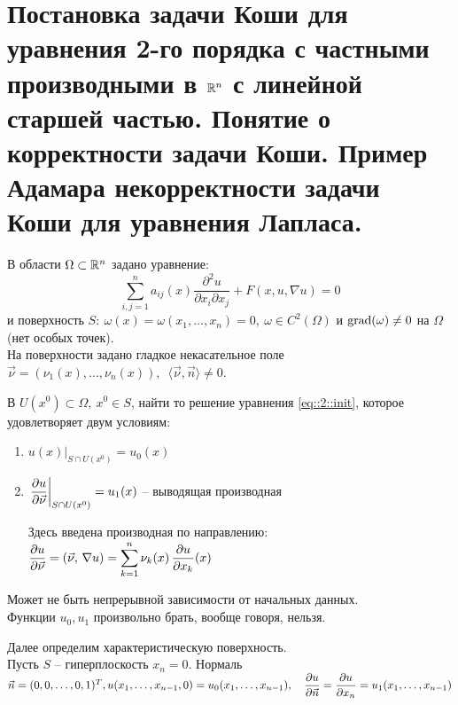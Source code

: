 \documentclass[../main.tex]{subfiles}
\begin{document}
\section{Постановка задачи Коши для уравнения 2-го порядка с частными производными в \texorpdfstring{$\mathbb{R}^n$}{R\textasciicircum n} с линейной старшей частью. Понятие о корректности задачи Коши. Пример Адамара некорректности задачи Коши для уравнения Лапласа.}
В области $\Omega \subset \mathbb{R}^n$ задано уравнение:
\begin{equation}
\label{eq::2::init}
\sum\limits_{i,j=1}^{n} a_{ij}(x)\frac{\partial^2u}{\partial x_i\partial x_j} + F(x, u, \nabla u) = 0
\end{equation}
и поверхность $S:\ \omega(x) = \omega(x_1, \dots, x_n) = 0,\ \omega \in C^2(\Omega)$ и $\operatorname{grad}(\omega) \not= 0$ на $\Omega$ (нет особых точек).\\
На поверхности задано гладкое некасательное поле $\vec{\nu} = (\nu_1(x), \dots, \nu_n(x)),\ \; \langle \vec{\nu}, \vec{n} \rangle \not= 0$.
\begin{definition}
В $U(x^0)\subset\Omega,\ x^0 \in S$, найти то решение уравнения \eqref{eq::2::init}, которое удовлетворяет двум условиям:
\begin{enumerate}
\item $u(x)|_{S\cap U(x^0)}=u_0(x)$
\item $\left. \dfrac{\partial u}{\partial \vec{\nu}}\right|_{S\cap U(x^0)} = u_1(x)$ -- выводящая производная

Здесь введена производная по направлению: $\dfrac{\partial u}{\partial \vec{\nu}} = \left(\vec{\nu},\, \nabla u\right) = \displaystyle\sum\limits_{k=1}^{n} \nu_k(x)\, \dfrac{\partial u}{\partial x_k}(x) $
\end{enumerate}
\end{definition}
Может не быть непрерывной зависимости от начальных данных.\\
Функции $u_0, u_1$ произвольно брать, вообще говоря, нельзя.


Далее определим характеристическую поверхность.\\
Пусть $S$ -- гиперплоскость $x_n = 0$. Нормаль $\vec{n} = (0,0,\dots,0, 1)^T,\\
u(x_1, \dots, x_{n-1}, 0) = u_0(x_1, \dots, x_{n-1}),\quad \dfrac{\partial u}{\partial\vec{n}} = \dfrac{\partial u}{\partial x_n} = u_1(x_1, \dots, x_{n-1}) $
\end{document}
